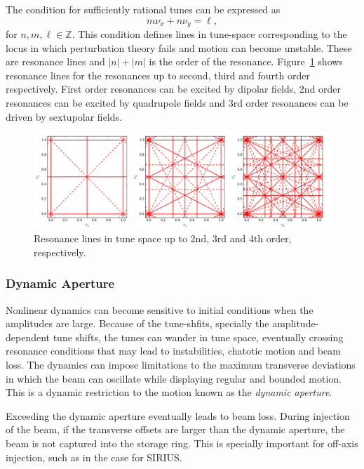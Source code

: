 The condition for sufficiently rational tunes can be expressed as
    $$m\nu_x + n\nu_y = \ell,$$
    for $n, m, \ell\in\mathbb{Z}$. This condition defines lines in tune-space corresponding to the locus in which perturbation theory fails and motion can become unstable. These are resonance lines and $|n|+|m|$ is the order of the resonance. Figure~\ref{resons} shows resonance lines for the resonances up to second, third and fourth order respectively. First order resonances can be excited by dipolar fields, 2nd order resonances can be excited by quadrupole fields and 3rd order resonances can be driven by sextupolar fields.
\begin{figure}[thb]
    \centering
    \includegraphics[width=\textwidth]{Images/tunes.png}
    \caption{Resonance lines in tune space up to 2nd, 3rd and 4th order, respectively.}
    \label{resons}
\end{figure}
\subsubsection{Dynamic Aperture}
    Nonlinear dynamics can become sensitive to initial conditions when the amplitudes are large. Because of the tune-shfits, specially the amplitude-dependent tune shifts, the tunes can wander in tune space, eventually crossing resonance conditions that may lead to instabilities, chatotic motion and beam loss. The dynamics can impose limitations to the maximum transverse deviations in which the beam can oscillate while displaying regular and bounded motion. This is a dynamic restriction to the motion known as the \textit{dynamic aperture}.

    Exceeding the dynamic aperture eventually leads to beam loss. During injection of the beam, if the transverse offsets are larger than the dynamic aperture, the beam is not captured into the storage ring. This is specially important for off-axis injection, such as in the case for SIRIUS.
